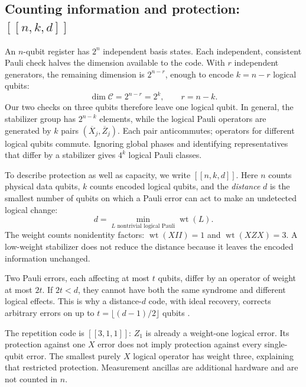 \documentclass[11pt,a4paper]{article}
\newcommand{\wt}{\operatorname{wt}}
\begin{document}
\subsection{Counting information and protection: \texorpdfstring{\([[n,k,d]]\)}{[[n,k,d]]}}
An \(n\)-qubit register has \(2^n\) independent basis states. Each independent, consistent Pauli check halves the dimension available to the code. With \(r\) independent generators, the remaining dimension is \(2^{n-r}\), enough to encode \(k=n-r\) logical qubits:
\begin{equation}\label{eq:count}
\dim\mathcal C=2^{n-r}=2^k,\qquad r=n-k.
\end{equation}
Our two checks on three qubits therefore leave one logical qubit. In general, the stabilizer group has \(2^{n-k}\) elements, while the logical Pauli operators are generated by \(k\) pairs \((\overline X_j,\overline Z_j)\). Each pair anticommutes; operators for different logical qubits commute. Ignoring global phases and identifying representatives that differ by a stabilizer gives \(4^k\) logical Pauli classes.

To describe protection as well as capacity, we write \([[n,k,d]]\). Here \(n\) counts physical data qubits, \(k\) counts encoded logical qubits, and the \emph{distance} \(d\) is the smallest number of qubits on which a Pauli error can act to make an undetected logical change:
\begin{equation}\label{eq:distance}
d=\min_{L\text{ nontrivial logical Pauli}}\wt(L).
\end{equation}
The weight counts nonidentity factors: \(\wt(XII)=1\) and \(\wt(XZX)=3\). A low-weight stabilizer does not reduce the distance because it leaves the encoded information unchanged.

Two Pauli errors, each affecting at most \(t\) qubits, differ by an operator of weight at most \(2t\). If \(2t<d\), they cannot have both the same syndrome and different logical effects. This is why a distance-\(d\) code, with ideal recovery, corrects arbitrary errors on up to \(t=\lfloor(d-1)/2\rfloor\) qubits \cite{gottesman}.

The repetition code is \([[3,1,1]]\): \(Z_1\) is already a weight-one logical error. Its protection against one \(X\) error does not imply protection against every single-qubit error. The smallest purely \(X\) logical operator has weight three, explaining that restricted protection. Measurement ancillas are additional hardware and are not counted in \(n\).
\end{document}
